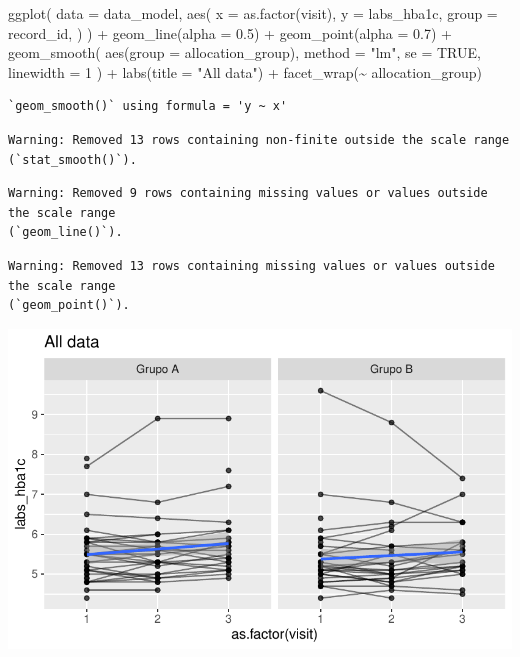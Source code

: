 \documentclass[
  letterpaper,
  DIV=11,
  numbers=noendperiod]{scrartcl}
\newenvironment{Shaded}{\begin{snugshade}}{\end{snugshade}}
\newcommand{\AttributeTok}[1]{\textcolor[rgb]{0.40,0.45,0.13}{#1}}
\newcommand{\ConstantTok}[1]{\textcolor[rgb]{0.56,0.35,0.01}{#1}}
\newcommand{\DecValTok}[1]{\textcolor[rgb]{0.68,0.00,0.00}{#1}}
\newcommand{\FloatTok}[1]{\textcolor[rgb]{0.68,0.00,0.00}{#1}}
\newcommand{\FunctionTok}[1]{\textcolor[rgb]{0.28,0.35,0.67}{#1}}
\newcommand{\NormalTok}[1]{\textcolor[rgb]{0.00,0.23,0.31}{#1}}
\newcommand{\SpecialCharTok}[1]{\textcolor[rgb]{0.37,0.37,0.37}{#1}}
\newcommand{\StringTok}[1]{\textcolor[rgb]{0.13,0.47,0.30}{#1}}
\begin{document}
\begin{Shaded}
\begin{Highlighting}[]
\FunctionTok{ggplot}\NormalTok{(}
    \AttributeTok{data =}\NormalTok{ data\_model, }
    \FunctionTok{aes}\NormalTok{(}
        \AttributeTok{x =} \FunctionTok{as.factor}\NormalTok{(visit),}
        \AttributeTok{y =}\NormalTok{ labs\_hba1c,}
        \AttributeTok{group =}\NormalTok{ record\_id,}
\NormalTok{    )}
\NormalTok{) }\SpecialCharTok{+}
    \FunctionTok{geom\_line}\NormalTok{(}\AttributeTok{alpha =} \FloatTok{0.5}\NormalTok{) }\SpecialCharTok{+}
    \FunctionTok{geom\_point}\NormalTok{(}\AttributeTok{alpha =} \FloatTok{0.7}\NormalTok{) }\SpecialCharTok{+}
    \FunctionTok{geom\_smooth}\NormalTok{(}
        \FunctionTok{aes}\NormalTok{(}\AttributeTok{group =}\NormalTok{ allocation\_group),}
        \AttributeTok{method =} \StringTok{"lm"}\NormalTok{,}
        \AttributeTok{se =} \ConstantTok{TRUE}\NormalTok{,}
        \AttributeTok{linewidth =} \DecValTok{1}
\NormalTok{    ) }\SpecialCharTok{+}
    \FunctionTok{labs}\NormalTok{(}\AttributeTok{title =} \StringTok{"All data"}\NormalTok{) }\SpecialCharTok{+}
    \FunctionTok{facet\_wrap}\NormalTok{(}\SpecialCharTok{\textasciitilde{}}\NormalTok{ allocation\_group) }
\end{Highlighting}
\end{Shaded}

\begin{verbatim}
`geom_smooth()` using formula = 'y ~ x'
\end{verbatim}

\begin{verbatim}
Warning: Removed 13 rows containing non-finite outside the scale range
(`stat_smooth()`).
\end{verbatim}

\begin{verbatim}
Warning: Removed 9 rows containing missing values or values outside the scale range
(`geom_line()`).
\end{verbatim}

\begin{verbatim}
Warning: Removed 13 rows containing missing values or values outside the scale range
(`geom_point()`).
\end{verbatim}

\includegraphics{Outcomes_V1V2V3_files/figure-pdf/labs_hba1c_6-1.pdf}
\end{document}
